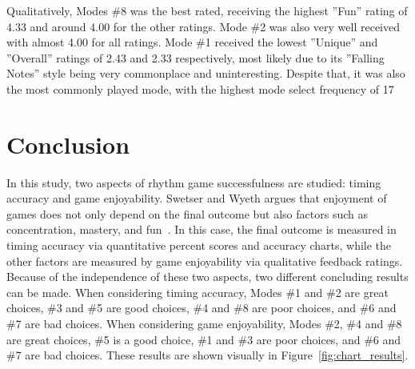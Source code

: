 \documentclass{sig-alternate}
\begin{document}
Qualitatively, Modes \#8 was the best rated, receiving the highest ''Fun'' rating of 4.33 and around 4.00 for the other ratings. Mode \#2 was also very well received with almost 4.00 for all ratings. Mode \#1 received the lowest ''Unique'' and ''Overall'' ratings of 2.43 and 2.33 respectively, most likely due to its ''Falling Notes'' style being very commonplace and uninteresting. Despite that, it was also the most commonly played mode, with the highest mode select frequency of 17%

\section{Conclusion}
\label{sec:conclusion}

In this study, two aspects of rhythm game successfulness are studied: timing accuracy and game enjoyability. Swetser and Wyeth argues that enjoyment of games does not only depend on the final outcome but also factors such as concentration, mastery, and fun~\cite{gameflow}. In this case, the final outcome is measured in timing accuracy via quantitative percent scores and accuracy charts, while the other factors are measured by game enjoyability via qualitative feedback ratings. \\

Because of the independence of these two aspects, two different concluding results can be made. When considering timing accuracy, Modes \#1 and \#2 are great choices, \#3 and \#5 are good choices, \#4 and \#8 are poor choices, and \#6 and \#7 are bad choices. When considering game enjoyability, Modes \#2, \#4 and \#8 are great choices, \#5 is a good choice, \#1 and \#3 are poor choices, and \#6 and \#7 are bad choices. These results are shown visually in Figure~\ref{fig:chart_results}.
\end{document}
